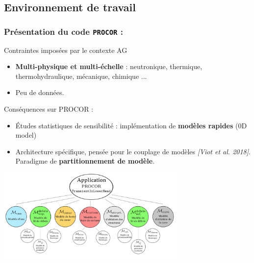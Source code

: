 \documentclass{beamer}
\newcommand{\procor}{\texttt{PROCOR}}
\newcommand{\bib}[1]{{\color{cea_texte!80}\tiny\textit{[#1]}}}
\begin{document}
\subsection{Environnement de travail}
\begin{frame}
    \frametitle{Présentation du code \procor{} :}
    \scriptsize
      \begin{ceablock}{Contraintes imposées par le contexte AG}
		\begin{itemize}
			\item \textbf{Multi-physique et multi-échelle} : neutronique, thermique, thermohydraulique, mécanique, chimique ... 
			\item Peu de données.
		\end{itemize}
    \end{ceablock}
    \begin{ceablock}{Conséquences sur PROCOR :}
		\begin{itemize}
			\item Études statistiques de sensibilité : implémentation de \textbf{modèles rapides} (0D model)
			\item Architecture spécifique, pensée pour le couplage de modèles \bib{Viot et al. 2018}. Paradigme de \textbf{partitionnement de modèle}.
		\end{itemize}
    \end{ceablock}
    \begin{center}
    	\includegraphics[width=0.7\textwidth]{Figures/applicationProcor.png}
    \end{center}
\end{frame}
\end{document}
